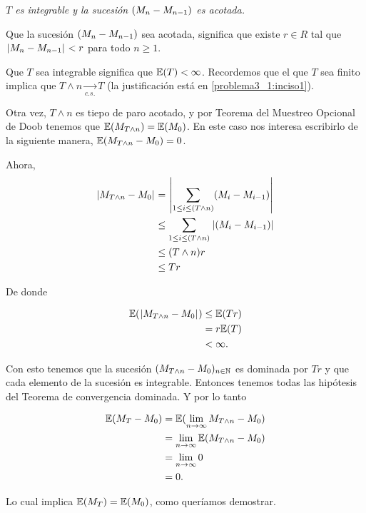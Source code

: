 \emph{
    $T$ es integrable y la sucesi\'on $\left( M_n-M_{n-1}\right) $ es acotada.
}

Que la sucesión $\left( M_n-M_{n-1}\right) $ sea acotada, significa que existe $r \in R$ tal que
$\hspace{.25mm}\left|M_n - M_{n-1}\right|\hspace{.25mm} < r$ para todo $n \geq 1$.\pn

Que $T$ sea integrable significa que $\mathbb{E}(T) < \infty$. Recordemos que el que $T$ sea finito implica que 
$T \wedge n \underset{c.s.}\longrightarrow T$ (la justificación está en \ref{problema3_1:inciso1}). \pn

Otra vez, $T \wedge n$ es tiepo de paro acotado, y por Teorema del Muestreo Opcional de Doob tenemos que 
$\mathbb{E}(M_{T \wedge n}) = \mathbb{E}(M_0)$. En este caso nos interesa escribirlo de la siguiente manera, 
$\mathbb{E}(M_{T \wedge n} - M_0) = 0$.\pn

Ahora, 
\begin{align}
    \hspace{.25mm}\left|M_{T \wedge n} - M_0\right|\hspace{.25mm}  &=      \hspace{.25mm}\left|\sum_{1 \leq i \leq (T \wedge n)} (M_i - M_{i-1})\right|\hspace{.25mm}     \\
                                &\leq   \sum_{1 \leq i \leq (T \wedge n)} \hspace{.25mm}\left|(M_i - M_{i-1})\right|\hspace{.25mm}     \\
                                &\leq   (T \wedge n) r                                              \\      
                                &\leq   T r                                                    
\end{align}

De donde 

\begin{align}
        \mathbb{E}(\hspace{.25mm}\left|M_{T \wedge n} - M_0\right|\hspace{.25mm})  &\leq   \mathbb{E}(T r) \\
                                        &= r \mathbb{E}(T)      \\
                                        &< \infty.
\end{align} \pn

Con esto tenemos que la sucesión $(M_{T \wedge n} - M_0)_{n \in \mathbb{N}}$ es dominada por $Tr$ y que cada 
elemento de la sucesión es integrable. Entonces tenemos todas las hipótesis del Teorema de convergencia dominada.
Y por lo tanto

\begin{align}
        \mathbb{E}(M_T - M_0)   &=  \mathbb{E}(\lim_{n \rightarrow \infty} M_{T \wedge n} - M_0)        \\
                        &=  \lim_{n \rightarrow \infty} \mathbb{E}(M_{T \wedge n} - M_0)        \\
                        &=  \lim_{n \rightarrow \infty} 0                               \\
                        &=  0.                        
\end{align}\pn

Lo cual implica $\mathbb{E}(M_T) = \mathbb{E}(M_0)$, como queríamos demostrar.